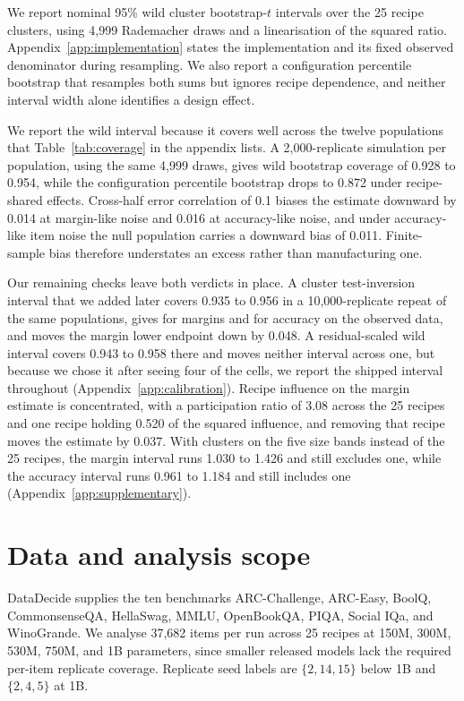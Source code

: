 We report nominal 95\% wild cluster bootstrap-$t$ intervals over the 25 recipe clusters, using 4,999 Rademacher draws and a linearisation of the squared ratio. Appendix~\ref{app:implementation} states the implementation and its fixed observed denominator during resampling. We also report a configuration percentile bootstrap that resamples both sums but ignores recipe dependence, and neither interval width alone identifies a design effect.

We report the wild interval because it covers well across the twelve populations that Table~\ref{tab:coverage} in the appendix lists. A 2,000-replicate simulation per population, using the same 4,999 draws, gives wild bootstrap coverage of 0.928 to 0.954, while the configuration percentile bootstrap drops to 0.872 under recipe-shared effects. Cross-half error correlation of 0.1 biases the estimate downward by 0.014 at margin-like noise and 0.016 at accuracy-like noise, and under accuracy-like item noise the null population carries a downward bias of 0.011. Finite-sample bias therefore understates an excess rather than manufacturing one.

Our remaining checks leave both verdicts in place. A cluster test-inversion interval that we added later covers 0.935 to 0.956 in a 10,000-replicate repeat of the same populations, gives  for margins and  for accuracy on the observed data, and moves the margin lower endpoint down by 0.048. A residual-scaled wild interval covers 0.943 to 0.958 there and moves neither interval across one, but because we chose it after seeing four of the cells, we report the shipped interval throughout (Appendix~\ref{app:calibration}). Recipe influence on the margin estimate is concentrated, with a participation ratio of 3.08 across the 25 recipes and one recipe holding 0.520 of the squared influence, and removing that recipe moves the estimate by 0.037. With clusters on the five size bands instead of the 25 recipes, the margin interval runs 1.030 to 1.426 and still excludes one, while the accuracy interval runs 0.961 to 1.184 and still includes one (Appendix~\ref{app:supplementary}).

\section{Data and analysis scope}
DataDecide supplies the ten benchmarks ARC-Challenge, ARC-Easy, BoolQ, CommonsenseQA, HellaSwag, MMLU, OpenBookQA, PIQA, Social IQa, and WinoGrande. We analyse 37,682 items per run across 25 recipes at 150M, 300M, 530M, 750M, and 1B parameters, since smaller released models lack the required per-item replicate coverage. Replicate seed labels are $\{2,14,15\}$ below 1B and $\{2,4,5\}$ at 1B.

